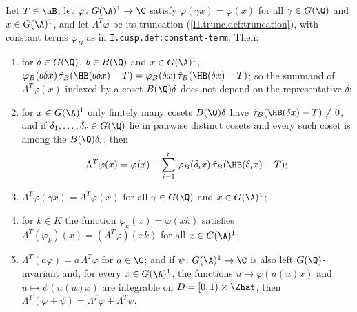 Let $T\in\aB$, let $\varphi\colon G(\A)^1\to\C$ satisfy $\varphi(\gamma x)=\varphi(x)$ for all $\gamma\in G(\Q)$ and $x\in G(\A)^1$, and let
$\Lambda^T\varphi$ be its truncation (\cref{II.trunc.def:truncation}), with constant terms $\varphi_B$ as in \texttt{I.cusp.def:constant-term}.
Then:
\begin{enumerate}
  \item[(a)] for $\delta\in G(\Q)$, $b\in B(\Q)$ and $x\in G(\A)^1$,
  $\varphi_B(b\delta x)\,\hat\tau_B(\HB(b\delta x)-T)=\varphi_B(\delta x)\,\hat\tau_B(\HB(\delta x)-T)$; so the summand of $\Lambda^T\varphi(x)$
  indexed by a coset $B(\Q)\delta$ does not depend on the representative $\delta$;
  \item[(b)] for $x\in G(\A)^1$ only finitely many cosets $B(\Q)\delta$ have $\hat\tau_B(\HB(\delta x)-T)\neq0$, and if $\delta_1,\dots,\delta_r\in G(\Q)$
  lie in pairwise distinct cosets and every such coset is among the $B(\Q)\delta_i$, then
  \[
    \Lambda^T\varphi(x)=\varphi(x)-\sum_{i=1}^r\varphi_B(\delta_ix)\,\hat\tau_B(\HB(\delta_ix)-T);
  \]
  \item[(c)] $\Lambda^T\varphi(\gamma x)=\Lambda^T\varphi(x)$ for all $\gamma\in G(\Q)$ and $x\in G(\A)^1$;
  \item[(d)] for $k\in K$ the function $\varphi_k(x)=\varphi(xk)$ satisfies $\Lambda^T(\varphi_k)(x)=(\Lambda^T\varphi)(xk)$ for all $x\in G(\A)^1$;
  \item[(e)] $\Lambda^T(a\varphi)=a\,\Lambda^T\varphi$ for $a\in\C$; and if $\psi\colon G(\A)^1\to\C$ is also left $G(\Q)$-invariant and, for every
  $x\in G(\A)^1$, the functions $u\mapsto\varphi(n(u)x)$ and $u\mapsto\psi(n(u)x)$ are integrable on $D=[0,1)\times\Zhat$, then
  $\Lambda^T(\varphi+\psi)=\Lambda^T\varphi+\Lambda^T\psi$.
\end{enumerate}
